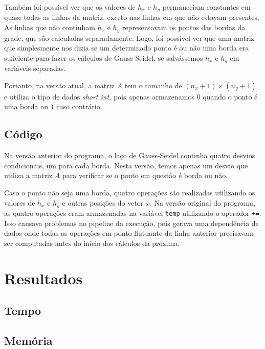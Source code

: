 \documentclass[12pt]{article}
\begin{document}
	Também foi possível ver que os valores de $h_x$ e $h_y$ permaneciam constantes em quase todas as linhas da matriz, exceto nas linhas em que não estavam presentes.
	As linhas que não continham $h_x$ e $h_y$ representavam os pontos das bordas da grade, que são calculadas separadamente.
	Logo, foi possível ver que uma matriz que simplesmente nos dizia se um determinado ponto é ou não uma borda era suficiente para fazer os cálculos de Gauss-Seidel, se salvássemos $h_x$ e $h_y$ em variáveis separadas.
	
	Portanto, na versão atual, a matriz $A$ tem o tamanho de $(n_x+1)\times(n_y+1)$ e utiliza o tipo de dados \emph{short int}, pois apenas armazenamos $0$ quando o ponto é uma borda ou $1$ caso contrário.

	\subsection{Código}
	
	Na versão anterior do programa, o laço de Gauss-Seidel continha quatro desvios condicionais, um para cada borda.
	Nesta versão, temos apenas um desvio que utiliza a matriz $A$ para verificar se o ponto em questão é borda ou não.
	
	Caso o ponto não seja uma borda, quatro operações são realizadas utilizando os valores de $h_x$ e $h_y$ e outras posições do vetor $x$.
	Na versão original do programa, as quatro operações eram armazenadas na variável \texttt{temp} utilizando o operador \texttt{+=}.
	Isso causava problemas no pipeline da execução, pois gerava uma dependência de dados onde todas as operações em ponto flutuante da linha anterior precisavam ser computadas antes do início dos cálculos da próxima.

\newpage

\section{Resultados}

\subsection{Tempo}

\subsection{Memória}

\newpage
\end{document}
